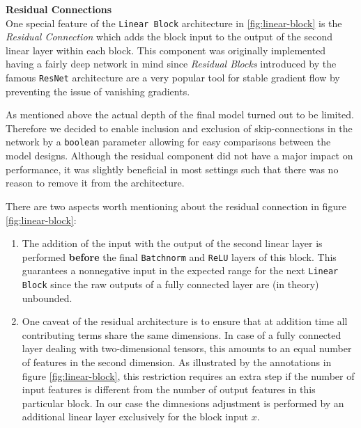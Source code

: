 \documentclass[12pt, letterpaper]{article}
\begin{document}
\textbf{Residual Connections} \\
One special feature of the \texttt{Linear Block} architecture in \ref{fig:linear-block} is the \emph{Residual Connection} which adds the block input to the output of the second linear layer within each block.
This component was originally implemented having a fairly deep network in mind since \emph{Residual Blocks} introduced by the famous \texttt{ResNet} architecture \cite{he2015} are a very popular tool for stable gradient flow by preventing the issue of vanishing gradients.

As mentioned above the actual depth of the final model turned out to be limited.
Therefore we decided to enable inclusion and exclusion of skip-connections in the network by a \texttt{boolean} parameter allowing for easy comparisons between the model designs.
Although the residual component did not have a major impact on performance, it was slightly beneficial in most settings such that there was no reason to remove it from the architecture.

There are two aspects worth mentioning about the residual connection in figure \ref{fig:linear-block}:
\begin{enumerate}
    \item The addition of the input with the output of the second linear layer is performed \textbf{before} the final \texttt{Batchnorm} and \texttt{ReLU} layers of this block.
          This guarantees a nonnegative input in the expected range for the next \texttt{Linear Block} since the raw outputs of a fully connected layer are (in theory) unbounded.

    \item One caveat of the residual architecture is to ensure that at addition time all contributing terms share the same dimensions.
          In case of a fully connected layer dealing with two-dimensional tensors, this amounts to an equal number of features in the second dimension.
          As illustrated by the annotations in figure \ref{fig:linear-block}, this restriction requires an extra step if the number of input features is different from the number of output features in this particular block.
          In our case the dimnesions adjustment is performed by an additional linear layer exclusively for the block input $x$.
\end{enumerate}
\end{document}
